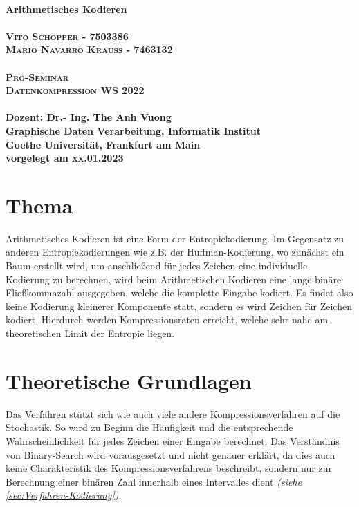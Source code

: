 \documentclass[a4paper]{article}
\theoremstyle{definition}
\theoremstyle{remark}
\begin{document}
	\begin{titlepage}
	
	\begin{center}

		\huge \textbf{\textsf{
		\\Arithmetisches Kodieren}} \\
		\LARGE\textbf{\textsc{\\
		Vito Schopper - 7503386
		\\
		Mario Navarro Krauß - 7463132}}\\ 
		\vspace{2cm}
		\LARGE\textbf{\textsc{\\Pro-Seminar
		\\ Datenkompression WS 2022}}\\ 
		\vspace{2.5cm}
		\large \textbf{
		\\
				Dozent: {Dr.- Ing. The Anh Vuong} \\
Graphische Daten Verarbeitung, Informatik Institut
\\
Goethe Universität, Frankfurt am Main
\\
vorgelegt am xx.01.2023 %
}
	\end{center}
\end{titlepage}
\tableofcontents\newpage
	
\section{Thema}
\label{sec:Thema}
Arithmetisches Kodieren ist eine Form der Entropiekodierung. Im Gegensatz zu anderen Entropiekodierungen wie z.B. der Huffman-Kodierung, wo zunächst ein Baum erstellt wird, um anschließend für jedes Zeichen eine individuelle Kodierung zu berechnen, wird beim Arithmetischen Kodieren eine lange binäre Fließkommazahl ausgegeben, welche die komplette Eingabe kodiert. Es findet also keine Kodierung kleinerer Komponente statt, sondern es wird Zeichen für Zeichen kodiert. Hierdurch werden Kompressionsraten erreicht, welche sehr nahe am theoretischen Limit der Entropie liegen.\cite{WIKI}

		\section{Theoretische Grundlagen}
Das Verfahren stützt sich wie auch viele andere Kompressionsverfahren auf die Stochastik. So wird zu Beginn die Häufigkeit und die entsprechende Wahrscheinlichkeit für jedes Zeichen einer Eingabe berechnet. Das Verständnis von Binary-Search wird vorausgesetzt und nicht genauer erklärt, da dies auch keine Charakteristik des Kompressionsverfahrens beschreibt, sondern nur zur Berechnung einer binären Zahl innerhalb eines Intervalles dient \textit{(siehe \ref{sec:Verfahren-Kodierung})}.
\end{document}

